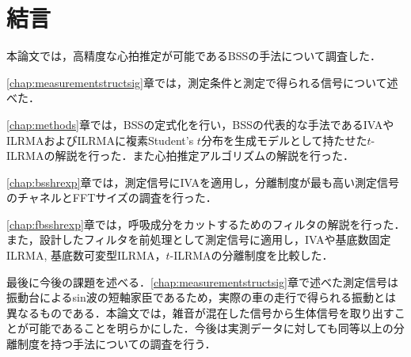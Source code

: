 \chapter{結言}
\label{chap:con}

本論文では，高精度な心拍推定が可能であるBSSの手法について調査した．

\ref{chap:measurementstructsig}章では，測定条件と測定で得られる信号について述べた．

\ref{chap:methods}章では，BSSの定式化を行い，BSSの代表的な手法であるIVAやILRMAおよびILRMAに複素Student's $t$分布を生成モデルとして持たせた$t$-ILRMAの解説を行った．また心拍推定アルゴリズムの解説を行った．

\ref{chap:bsshrexp}章では，測定信号にIVAを適用し，分離制度が最も高い測定信号のチャネルとFFTサイズの調査を行った．

\ref{chap:fbsshrexp}章では，呼吸成分をカットするためのフィルタの解説を行った．また，設計したフィルタを前処理として測定信号に適用し，IVAや基底数固定ILRMA, 基底数可変型ILRMA，$t$-ILRMAの分離制度を比較した．

最後に今後の課題を述べる．\ref{chap:measurementstructsig}章で述べた測定信号は振動台によるsin波の短軸家臣であるため，実際の車の走行で得られる振動とは異なるものである．本論文では，雑音が混在した信号から生体信号を取り出すことが可能であることを明らかにした．今後は実測データに対しても同等以上の分離制度を持つ手法についての調査を行う．